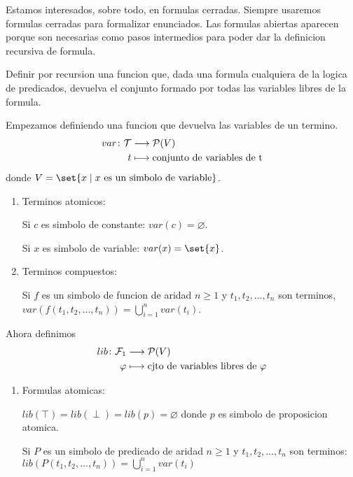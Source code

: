 \begin{remark}
	Estamos interesados, sobre todo, en formulas cerradas. Siempre usaremos formulas cerradas para formalizar enunciados. Las formulas abiertas aparecen porque son necesarias como pasos intermedios para poder dar la definicion recursiva de formula.
\end{remark}
\begin{example}
	Definir por recursion una funcion que, dada una formula cualquiera de la logica de predicados, devuelva el conjunto formado por todas las variables libres de la formula.

	Empezamos definiendo una funcion que devuelva las variables de un termino.
	\[
		\begin{aligned}
			var \colon \mathcal{\MakeUppercase{t}} & \longrightarrow \mathcal{\MakeUppercase{p}}(V ) \\
			t                                      & \longmapsto \text{conjunto de variables de t}
		\end{aligned}
	\]
	donde \(V = \set{x \mid x \text{ es un simbolo de variable} }\).

	\begin{enumerate}
		\item Terminos atomicos:

		      Si \(c \) es simbolo de constante: \(var(c) = \varnothing \).

		      Si \(x \) es simbolo de variable: \(var(x) = \set{x }\).
		\item Terminos compuestos:

		      Si \(f \) es un simbolo de funcion de aridad \(n \geq  1 \) y \(t_1,t_2,\ldots,t_n \) son terminos, \(var(f(t_1,t_2,\ldots,t_n )) = \bigcup_{i = 1}^{n} var(t_i)\).
	\end{enumerate}

	Ahora definimos
	\[
		\begin{aligned}
			lib \colon \mathcal{\MakeUppercase{f}}_1 & \longrightarrow \mathcal{\MakeUppercase{p}}(V )        \\
			\varphi                                  & \longmapsto \text{cjto de variables libres de }\varphi
		\end{aligned}
	\]
	\begin{enumerate}[resume]
		\item Formulas atomicas:

		      \(lib(\top) = lib(\perp) = lib(p) = \varnothing \) donde \(p \) es simbolo de proposicion atomica.

		      Si \(P \) es un simbolo de predicado de aridad \(n \geq  1\) y \(t_1,t_2,\ldots,t_n \) son terminos: \(lib(P(t_1,t_2,\ldots,t_n)) = \bigcup_{i=1}^{n} var(t_i) \)


\end{enumerate}
\end{example}
